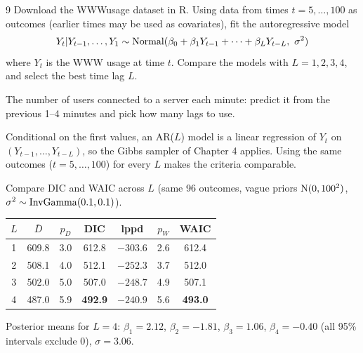 \documentclass[11pt]{article}
\begin{document}

\begin{problem}{9}
Download the WWWusage dataset in R. Using data from times $t=5,\dots,100$ as outcomes (earlier times may be used as covariates), fit the autoregressive model
\[
Y_t|Y_{t-1},\dots,Y_1\sim\dist{Normal}(\beta_0+\beta_1Y_{t-1}+\dots+\beta_LY_{t-L},\ \sigma^2)
\]
where $Y_t$ is the WWW usage at time $t$. Compare the models with $L=1,2,3,4$, and select the best time lag $L$.
\end{problem}

\begin{restate}
The number of users connected to a server each minute: predict it from the previous 1--4 minutes and pick how many lags to use.
\end{restate}

\begin{recall}
Conditional on the first values, an AR($L$) model is a linear regression of $Y_t$ on $(Y_{t-1},\dots,Y_{t-L})$, so the Gibbs sampler of Chapter 4 applies. Using the same outcomes ($t=5,\dots,100$) for every $L$ makes the criteria comparable.
\end{recall}

\begin{keyidea}
Compare DIC and WAIC across $L$ (same 96 outcomes, vague priors $\mathrm{N}(0,100^2)$, $\sigma^2\sim\mathrm{InvGamma}(0.1,0.1)$).
\end{keyidea}

\solution
\begin{center}
\begin{tabular}{ccccccc}\toprule
$L$ & $\bar D$ & $p_D$ & DIC & lppd & $p_W$ & WAIC\\\midrule
1 & 609.8 & 3.0 & 612.8 & $-303.6$ & 2.6 & 612.4\\
2 & 508.1 & 4.0 & 512.1 & $-252.3$ & 3.7 & 512.0\\
3 & 502.0 & 5.0 & 507.0 & $-248.7$ & 4.9 & 507.1\\
4 & 487.0 & 5.9 & \textbf{492.9} & $-240.9$ & 5.6 & \textbf{493.0}\\\bottomrule
\end{tabular}
\end{center}
Posterior means for $L=4$: $\beta_1=2.12$, $\beta_2=-1.81$, $\beta_3=1.06$, $\beta_4=-0.40$ (all 95\% intervals exclude 0), $\sigma=3.06$.
\end{document}
